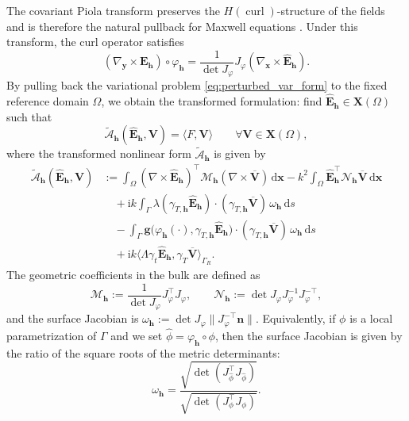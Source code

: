 \documentclass[10pt,a4paper]{amsart}
\numberwithin{equation}{section}
\begin{document}
The covariant Piola transform preserves the \(H(\operatorname{curl})\)-structure
of the fields and is therefore the natural pullback for Maxwell equations
\cite[Lemma~3.58]{Monk2003}. Under this transform, the curl operator satisfies
\[
(\nabla_{\boldsymbol y}\times \mathbf E_{\mathbf h})\circ\varphi_{\mathbf h}
=
\frac{1}{\det J_{\varphi}}
J_{\varphi}
(\nabla_{\boldsymbol x}\times \widehat{\mathbf E}_{\mathbf h}).
\]
By pulling back the variational problem \eqref{eq:perturbed_var_form} to the fixed reference domain $\Omega$, we obtain the transformed formulation: find $\hat{\mathbf{E}}_{\mathbf{h}} \in \mathbf{X}(\Omega)$ such that
\begin{equation}\label{eq:pullback_problem}
\widetilde{\mathcal{A}}_{\mathbf{h}}(\hat{\mathbf{E}}_{\mathbf{h}}, \mathbf{V}) = \langle F, \mathbf{V} \rangle \qquad \forall \mathbf{V} \in \mathbf{X}(\Omega),
\end{equation}
where the transformed nonlinear form $\widetilde{\mathcal{A}}_{\mathbf{h}}$ is given by
\begin{equation}\label{eq:weak_form_pullback_impedance}
\begin{aligned}
\widetilde{\mathcal{A}}_{\mathbf{h}}(\hat{\mathbf{E}}_{\mathbf{h}}, \mathbf{V}) &:= \int_{\Omega} (\nabla \times \hat{\mathbf{E}}_{\mathbf{h}})^{\top} \mathcal{M}_{\mathbf{h}} (\nabla \times \overline{\mathbf{V}}) \,\mathrm{d}\boldsymbol{x} - k^2 \int_{\Omega} \hat{\mathbf{E}}_{\mathbf{h}}^{\top} \mathcal{N}_{\mathbf{h}} \overline{\mathbf{V}} \,\mathrm{d}\boldsymbol{x} \\
&\quad + \mathrm{i}k \int_{\Gamma} \lambda (\gamma_{T,\mathbf{h}} \hat{\mathbf{E}}_{\mathbf{h}}) \cdot (\gamma_{T,\mathbf{h}} \overline{\mathbf{V}}) \, \omega_{\mathbf{h}} \,\mathrm{d}s \\
&\quad - \int_{\Gamma} \mathbf{g} \bigl( \varphi_{\mathbf{h}}(\cdot), \gamma_{T,\mathbf{h}} \hat{\mathbf{E}}_{\mathbf{h}} \bigr) \cdot (\gamma_{T,\mathbf{h}} \overline{\mathbf{V}}) \, \omega_{\mathbf{h}} \,\mathrm{d}s \\
&\quad + \mathrm{i}k \langle \Lambda \gamma_t \hat{\mathbf{E}}_{\mathbf{h}}, \gamma_T \overline{\mathbf{V}} \rangle_{\Gamma_R}.
\end{aligned}
\end{equation}
The geometric coefficients in the bulk are defined as
\[
\mathcal{M}_{\mathbf{h}} := \frac{1}{\det J_{\varphi}} J_{\varphi}^{\top} J_{\varphi}, \qquad \mathcal{N}_{\mathbf{h}} := \det J_{\varphi} J_{\varphi}^{-1} J_{\varphi}^{-\top},
\]
and the surface Jacobian is $\omega_{\mathbf{h}} := \det J_{\varphi} \|J_{\varphi}^{-\top} \mathbf{n}\|$. Equivalently, if $\phi$ is a local parametrization of $\Gamma$ and we set $\widehat{\phi} = \varphi_{\mathbf{h}} \circ \phi$, then the surface Jacobian is given by the ratio of the square roots of the metric determinants:
\[
\omega_{\mathbf{h}} = \frac{\sqrt{\det(J_{\widehat{\phi}}^{\top} J_{\widehat{\phi}})}}{\sqrt{\det(J_{\phi}^{\top} J_{\phi})}}.
\]
\end{document}
